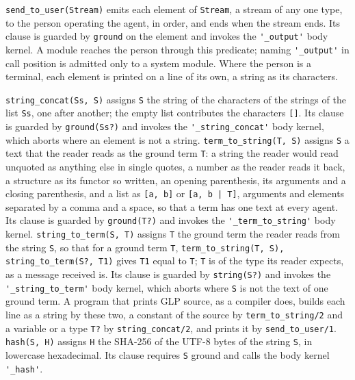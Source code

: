 \verb|send_to_user(Stream)| emits each element of \verb|Stream|, a stream of any one type, to the person operating the agent, in order, and ends when the stream ends. Its clause is guarded by \verb|ground| on the element and invokes the \verb|'_output'| body kernel. A module reaches the person through this predicate; naming \verb|'_output'| in call position is admitted only to a system module. Where the person is a terminal, each element is printed on a line of its own, a string as its characters.

\verb|string_concat(Ss, S)| assigns \verb|S| the string of the characters of the strings of the list \verb|Ss|, one after another; the empty list contributes the characters \verb|[]|. Its clause is guarded by \verb|ground(Ss?)| and invokes the \verb|'_string_concat'| body kernel, which aborts where an element is not a string. \verb|term_to_string(T, S)| assigns \verb|S| a text that the reader reads as the ground term \verb|T|: a string the reader would read unquoted as anything else in single quotes, a number as the reader reads it back, a structure as its functor so written, an opening parenthesis, its arguments and a closing parenthesis, and a list as \verb|[a, b]| or \verb~[a, b | T]~, arguments and elements separated by a comma and a space, so that a term has one text at every agent. Its clause is guarded by \verb|ground(T?)| and invokes the \verb|'_term_to_string'| body kernel. \verb|string_to_term(S, T)| assigns \verb|T| the ground term the reader reads from the string \verb|S|, so that for a ground term \verb|T|, \verb|term_to_string(T, S), string_to_term(S?, T1)| gives \verb|T1| equal to \verb|T|; \verb|T| is of the type its reader expects, as a message received is. Its clause is guarded by \verb|string(S?)| and invokes the \verb|'_string_to_term'| body kernel, which aborts where \verb|S| is not the text of one ground term. A program that prints GLP source, as a compiler does, builds each line as a string by these two, a constant of the source by \verb|term_to_string/2| and a variable or a type \verb|T?| by \verb|string_concat/2|, and prints it by \verb|send_to_user/1|. \verb|hash(S, H)| assigns \verb|H| the SHA-256 of the UTF-8 bytes of the string \verb|S|, in lowercase hexadecimal. Its clause requires \verb|S| ground and calls the body kernel \verb|'_hash'|.

